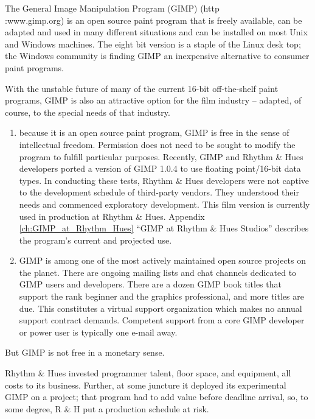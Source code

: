The General Image Manipulation Program (GIMP) (http\\:www.gimp.org)
is an open source paint program that is freely available, can be
adapted and used in many different situations and can be installed on
most Unix and Windows machines. The eight bit version is a staple of
the Linux desk top; the Windows community is finding GIMP an
inexpensive alternative to consumer paint programs.

With the unstable future of many of the current 16-bit off-the-shelf paint
programs, GIMP is also an attractive option for the film industry -- adapted,
of course, to the special needs of that industry. 

\begin{enumerate}

\item because it is an open source paint program, GIMP is free in the sense of
intellectual freedom. Permission does not need to be sought to modify
the program to fulfill particular purposes. Recently, GIMP and Rhythm
\& Hues developers ported a version of GIMP 1.0.4 to use floating
point/16-bit data types. In conducting these tests, Rhythm \& Hues developers
were not captive to the development schedule of third-party
vendors. They understood their needs and commenced exploratory
development. This film version is currently used
in production at Rhythm \& Hues. Appendix \ref{ch:GIMP_at_Rhythm_Hues} 
``GIMP at Rhythm \& Hues Studios'' describes the program's
current and projected use.

\item GIMP is among one of the most actively maintained open source projects
on the planet. There are ongoing mailing lists and chat channels
dedicated to GIMP users and developers. There are a dozen GIMP book
titles that support the rank beginner and the graphics professional,
and more titles are due. This constitutes a virtual support
organization which makes no annual support contract demands. Competent
support from a core GIMP developer or power user is typically one
e-mail away.

\end{enumerate}

But GIMP is not free in a monetary sense. 

Rhythm \& Hues invested programmer talent, floor space, and equipment,
all costs to its business. Further, at some juncture it deployed its
experimental GIMP on a project; that program had to add value before
deadline arrival, so, to some degree, R \& H put a production schedule
at risk.

